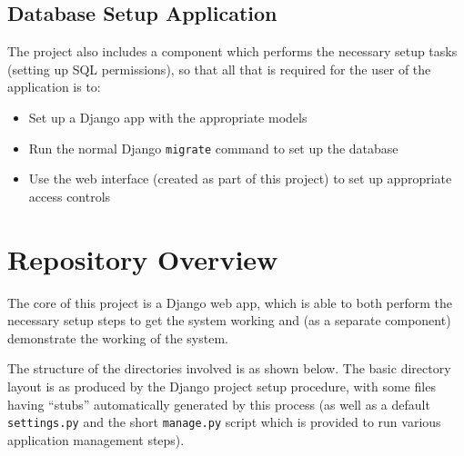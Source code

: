 \documentclass{report}
\begin{document}
\subsection{Database Setup Application}
The project also includes a component which performs the necessary setup tasks (setting up SQL permissions), so that all that is required for the user of the application is to:
\begin{itemize}
\item
  Set up a Django app with the appropriate models
\item
  Run the normal Django \texttt{migrate} command to set up the database
\item
  Use the web interface (created as part of this project) to set up appropriate access controls
\end{itemize}

\section{Repository Overview}
The core of this project is a Django web app, which is able to both perform the necessary setup steps to get the system working and (as a separate component) demonstrate the working of the system.

The structure of the directories involved is as shown below. The basic directory layout is as produced by the Django project setup procedure, with some files having ``stubs'' automatically generated by this process (as well as a default \texttt{settings.py} and the short \texttt{manage.py} script which is provided to run various application management steps).

\begin{multicols}{2}
  \columnbreak
\end{multicols}
\end{document}
